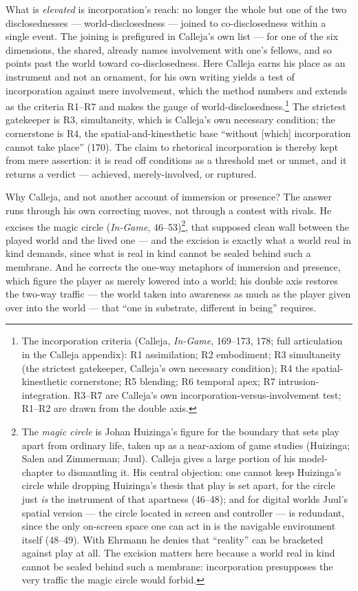 \documentclass{article}
\begin{document}
What is \textit{elevated} is incorporation's reach: no longer the whole but one of the two disclosednesses — world-disclosedness — joined to co-disclosedness within a single event. The joining is prefigured in Calleja's own list — for one of the six dimensions, the shared, already names involvement with one's fellows, and so points past the world toward co-disclosedness. Here Calleja earns his place as an instrument and not an ornament, for his own writing yields a test of incorporation against mere involvement, which the method numbers and extends as the criteria R1–R7 and makes the gauge of world-disclosedness.\footnote{The incorporation criteria (Calleja, \textit{In-Game}, 169–173, 178; full articulation in the Calleja appendix): R1 assimilation; R2 embodiment; R3 simultaneity (the strictest gatekeeper, Calleja's own necessary condition); R4 the spatial-kinesthetic cornerstone; R5 blending; R6 temporal apex; R7 intrusion-integration. R3–R7 are Calleja's own incorporation-versus-involvement test; R1–R2 are drawn from the double axis.} The strictest gatekeeper is R3, simultaneity, which is Calleja's own necessary condition; the cornerstone is R4, the spatial-and-kinesthetic base ``without [which] incorporation cannot take place'' (170). The claim to rhetorical incorporation is thereby kept from mere assertion: it is read off conditions as a threshold met or unmet, and it returns a verdict — achieved, merely-involved, or ruptured.

Why Calleja, and not another account of immersion or presence? The answer runs through his own correcting moves, not through a contest with rivals. He excises the magic circle (\textit{In-Game}, 46–53)\footnote{The \textit{magic circle} is Johan Huizinga's figure for the boundary that sets play apart from ordinary life, taken up as a near-axiom of game studies (Huizinga; Salen and Zimmerman; Juul). Calleja gives a large portion of his model-chapter to dismantling it. His central objection: one cannot keep Huizinga's circle while dropping Huizinga's thesis that play is set apart, for the circle just \textit{is} the instrument of that apartness (46–48); and for digital worlds Juul's spatial version — the circle located in screen and controller — is redundant, since the only on-screen space one can act in is the navigable environment itself (48–49). With Ehrmann he denies that ``reality'' can be bracketed against play at all. The excision matters here because a world real in kind cannot be sealed behind such a membrane: incorporation presupposes the very traffic the magic circle would forbid.}, that supposed clean wall between the played world and the lived one — and the excision is exactly what a world real in kind demands, since what is real in kind cannot be sealed behind such a membrane. And he corrects the one-way metaphors of immersion and presence, which figure the player as merely lowered into a world; his double axis restores the two-way traffic — the world taken into awareness as much as the player given over into the world — that ``one in substrate, different in being'' requires.
\end{document}
